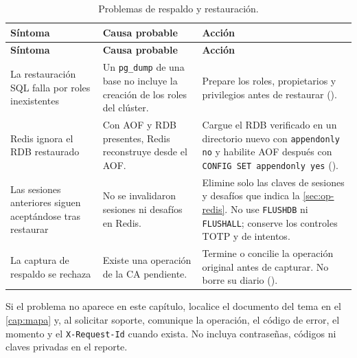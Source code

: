 {\small
\begin{longtable}{L{3.7cm} L{4.6cm} L{7.1cm}}
  \caption{Problemas de respaldo y restauración.}\label{tab:prob-respaldo} \\
  \toprule
  \textbf{Síntoma} & \textbf{Causa probable} & \textbf{Acción} \\
  \midrule
  \endfirsthead
  \toprule
  \textbf{Síntoma} & \textbf{Causa probable} & \textbf{Acción} \\
  \midrule
  \endhead
  \bottomrule
  \endfoot
    La restauración SQL falla por roles inexistentes
      & Un \texttt{pg\_dump} de una base no incluye la creación de los roles
        del clúster.
      & Prepare los roles, propietarios y privilegios antes de restaurar
        (). \\
    Redis ignora el RDB restaurado
      & Con AOF y RDB presentes, Redis reconstruye desde el AOF.
      & Cargue el RDB verificado en un directorio nuevo con
        \texttt{appendonly no} y habilite AOF después con
        \texttt{CONFIG SET appendonly yes}
        (). \\
    Las sesiones anteriores siguen aceptándose tras restaurar
      & No se invalidaron sesiones ni desafíos en Redis.
      & Elimine solo las claves de sesiones y desafíos que indica la
        \cref{sec:op-redis}. No use \texttt{FLUSHDB} ni
        \texttt{FLUSHALL}; conserve los controles TOTP y de intentos. \\
    La captura de respaldo se rechaza
      & Existe una operación de la CA pendiente.
      & Termine o concilie la operación original antes de capturar. No borre
        su diario (). \\
\end{longtable}}


Si el problema no aparece en este capítulo, localice el documento del tema en
el \cref{cap:mapa} y, al solicitar soporte, comunique la operación, el código de
error, el momento y el \texttt{X-Request-Id} cuando exista. No incluya
contraseñas, códigos ni claves privadas en el reporte.
